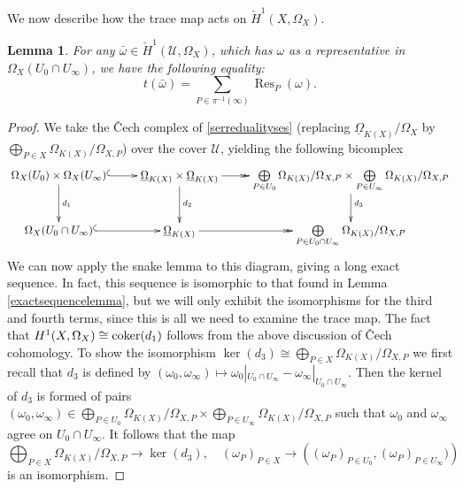 \documentclass[11pt]{article} %
\theoremstyle{plain}
\newtheorem{lem}[defn]{Lemma}
\theoremstyle{remark}
\newcommand{\ra}{\rightarrow}
\newcommand{\cU}{{\mathcal U}}
\newcommand{\cech}{\v{C}ech }
\DeclareMathOperator{\res}{Res}
\begin{document}
We now describe how the trace map acts on $\check{H}^1(X,\Omega_X)$.
\begin{lem}\label{tracemaplemma}
For any $\bar \omega \in \check{H}^1\left (\cU, \Omega_X\right )$, which has $\omega$ as a representative in $\Omega_X(U_0 \cap U_\infty)$, we have the following equality:
\[
t(\bar \omega) = \sum_{P \in \pi^{-1}(\infty)}\res_P(\omega).
\]
\end{lem}
\begin{proof}
We take the \cech complex of \eqref{serredualityses} (replacing $\underline{\Omega}_{K(X)}/\Omega_X$ by $\bigoplus_{P \in X}\Omega_{K(X)}/\Omega_{X,P}$) over the cover $\cU$, yielding the following bicomplex
\begin{equation}\label{dualitydiagram2}
\xymatrix{\Omega_X(U_0)\times\Omega_X(U_\infty) \ar@{^{(}->}[r] \ar[d]^{d_1} & \underline{\Omega}_{K(X)} \times \underline{\Omega}_{K(X)} \ar[d]^{d_2} \ar@{->>}[r] & \bigoplus \limits_{P \in U_0} \Omega_{K(X)}/\Omega_{X,P} \times \bigoplus \limits_{P \in U_\infty} \Omega_{K(X)}/\Omega_{X,P} \ar[d]^{d_3} \\
\Omega_X(U_0 \cap U_\infty) \ar@{^{(}->}[r]  & \underline{\Omega}_{K(X)} \ar@{->>}[r] & \bigoplus \limits_{P\in U_0 \cap U_\infty} \Omega_{K(X)}/\Omega_{X,P} }
\end{equation}
We can now apply the snake lemma to this diagram, giving a long exact sequence.
In fact, this sequence is isomorphic to that found in Lemma \ref{exactsequencelemma}, but we will only exhibit the isomorphisms for the third and fourth terms, since this is all we need to examine the trace map.
The fact that $H^1(X,\Omega_X) \cong {\rm coker}(d_1)$ follows from the above discussion of \cech cohomology.
To show the isomorphism $\ker(d_3) \cong \bigoplus_{P \in X} \Omega_{K(X)}/\Omega_{X,P}$ we first recall that $d_3$ is defined by $(\omega_0, \omega_\infty) \mapsto \omega_0|_{U_0 \cap U_\infty} - \omega_\infty|_{U_0 \cap U_\infty}$.
Then the kernel of $d_3$ is formed of pairs $(\omega_0, \omega_\infty) \in \bigoplus_{P \in U_0} \Omega_{K(X)}/\Omega_{X,P} \times \bigoplus_{P \in  U_\infty} \Omega_{K(X)}/\Omega_{X,P}$ such that $\omega_0$ and $\omega_\infty$ agree on $U_0 \cap U_\infty$.
It follows that the map 
\[
\bigoplus_{P \in X} \Omega_{K(X)}/\Omega_{X,P}\ra\ker(d_3), \quad  (\omega_P)_{P \in X} \to \left( (\omega_P)_{ P \in U_0}, (\omega_P)_{P \in U_\infty}) \right)
\]
is an isomorphism.


\end{proof}
\end{document}
